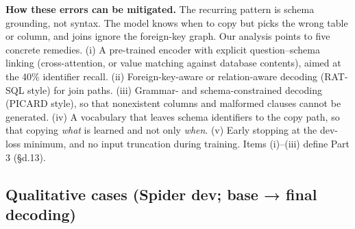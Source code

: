 \documentclass[
  10pt,
]{article}
\newcounter{none} %
\begin{document}
\textbf{How these errors can be mitigated.} The recurring pattern is
schema grounding, not syntax. The model knows when to copy but picks the
wrong table or column, and joins ignore the foreign-key graph. Our
analysis points to five concrete remedies. (i) A pre-trained encoder
with explicit question--schema linking (cross-attention, or value
matching against database contents), aimed at the 40\% identifier
recall. (ii) Foreign-key-aware or relation-aware decoding (RAT-SQL
style) for join paths. (iii) Grammar- and schema-constrained decoding
(PICARD style), so that nonexistent columns and malformed clauses cannot
be generated. (iv) A vocabulary that leaves schema identifiers to the
copy path, so that copying \emph{what} is learned and not only
\emph{when}. (v) Early stopping at the dev-loss minimum, and no input
truncation during training. Items (i)--(iii) define Part 3 (§d.13).

\subsection{Qualitative cases (Spider dev; base → final
decoding)}\label{qualitative-cases-spider-dev-base-final-decoding}
\end{document}
